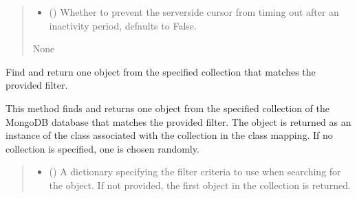 \documentclass[letterpaper,10pt,english]{sphinxmanual}
\begin{document}
\begin{fulllineitems}
\begin{fulllineitems}
\begin{quote}
\begin{description}
\begin{itemize}
\item {} 
\sphinxAtStartPar
{} (\sphinxstyleliteralemphasis{\sphinxupquote{, }}) \textendash{} Whether to prevent the server\sphinxhyphen{}side cursor from timing out after an inactivity period,
defaults to False.

\end{itemize}

\sphinxAtStartPar
None

\end{description}\end{quote}

\end{fulllineitems}


\begin{fulllineitems}
\label{\detokenize{forensicfit.database.database:forensicfit.database.database.Database.find_one}}
\pysigstartsignatures
{}
\pysigstopsignatures
\sphinxAtStartPar
Find and return one object from the specified collection that matches the provided filter.

\sphinxAtStartPar
This method finds and returns one object from the specified collection of the MongoDB database
that matches the provided filter. The object is returned as an instance of the class associated
with the collection in the class mapping. If no collection is specified, one is chosen randomly.
\begin{quote}\begin{description}
\sphinxAtStartPar
{}

\begin{itemize}
\item {} 
\sphinxAtStartPar
{} (\sphinxstyleliteralemphasis{\sphinxupquote{, }}) \textendash{} A dictionary specifying the filter criteria to use when searching for the object. If not
provided, the first object in the collection is returned.


\end{itemize}
\end{description}
\end{quote}
\end{fulllineitems}
\end{fulllineitems}
\end{document}

